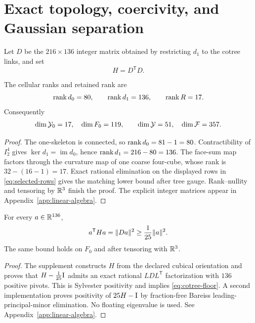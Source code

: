 \section{Exact topology, coercivity, and Gaussian separation}\label{sec:linear}

Let $D$ be the $216\times136$ integer matrix obtained by restricting $d_1$ to
the cotree links, and set
\begin{equation}\label{eq:H-def}
 H=D^{\mathsf T}D.
\end{equation}

\begin{proposition}\label{prop:dimensions}
The cellular ranks and retained rank are
\[
 \operatorname{rank} d_0=80,\qquad \operatorname{rank} d_1=136,\qquad \operatorname{rank} R=17.
\]
Consequently
\[
 \dim\mathcal Y_0=17,\quad \dim F_0=119,
 \qquad \dim\mathcal Y=51,\quad \dim\mathcal F=357.
\]
\end{proposition}

\begin{proof}
The one-skeleton is connected, so $\operatorname{rank} d_0=81-1=80$.  Contractibility of
$I_2^4$ gives $\ker d_1=\operatorname{im}d_0$, hence $\operatorname{rank} d_1=216-80=136$.
The face-sum map factors through the curvature map of one coarse four-cube,
whose rank is $32-(16-1)=17$.  Exact rational elimination on the displayed
rows in \eqref{eq:selected-rows} gives the matching lower bound after tree
gauge.  Rank--nullity and tensoring by $\mathbb R^3$ finish the proof.  The explicit
integer matrices appear in Appendix~\ref{app:linear-algebra}.
\end{proof}

\begin{theorem}\label{thm:cotree-coercivity}
For every $a\in\mathbb R^{136}$,
\begin{equation}\label{eq:cotree-floor}
 a^{\mathsf T}Ha=\lVert Da\rVert^2\ge\frac1{25}\lVert a\rVert^2.
\end{equation}
The same bound holds on $F_0$ and after tensoring with $\mathbb R^3$.
\end{theorem}

\begin{proof}
The supplement constructs $H$ from the declared cubical orientation and proves
that $H-\frac1{25}\mathrm I$ admits an exact rational $LDL^{\mathsf T}$
factorization with $136$ positive pivots.  This is Sylvester positivity and
implies \eqref{eq:cotree-floor}.  A second implementation proves positivity of
$25H-\mathrm I$ by fraction-free Bareiss leading-principal-minor elimination.  No
floating eigenvalue is used.  See Appendix~\ref{app:linear-algebra}.
\end{proof}

